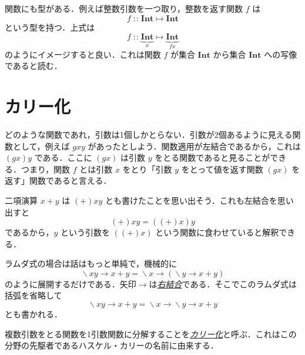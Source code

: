 \documentclass[a4paper]{jsbook}
\newcommand{\keyword}[1]{{\underline{\emph{#1}}}}
\newcommand{\mType}[1]{\mathbf{#1}}
\newcommand{\mIntType}{\mType{Int}}
\DeclareMathOperator{\mLambda}{\backslash}
\DeclareMathOperator{\mLambdaArrow}{\rightarrow}
\DeclareMathOperator{\mIn}{{:\!:}}
\DeclareMathOperator{\mMapsTo}{\mapsto}
\newcommand{\mLambdaExp}[2]{\mLambda{#1}\mLambdaArrow{#2}}
\newcommand{\mProjection}[2]{#1\mMapsTo#2}
\begin{document}
関数にも型がある．例えば整数引数を一つ取り，整数を返す関数 $f$ は
\begin{equation}
f\mIn\mProjection{\mIntType}{\mIntType}
\end{equation}
という型を持つ．上式は
\begin{equation}
f
\mIn\underbrace{\mIntType}_{x}
\mMapsTo
\underbrace{\mIntType}_{fx}
\end{equation}
のようにイメージすると良い．これは関数 $f$ が集合 $\mIntType$ から集合 $\mIntType$ への写像であると読む．

\section{カリー化}

どのような関数であれ，引数は1個しかとらない．引数が2個あるように見える関数として，例えば $gxy$ があったとしよう．関数適用が左結合であるから，これは $\left(gx\right)y$ である．ここに $\left(gx\right)$ は引数 $y$ をとる関数であると見ることができる．つまり，関数 $f$ とは引数 $x$ をとり「引数 $y$ をとって値を返す関数 $\left(gx\right)$ を返す」関数であると言える．

二項演算 $x+y$ は $(+)xy$ とも書けたことを思い出そう．これも左結合を思い出すと
\begin{equation}
(+)xy=\left((+)x\right)y
\end{equation}
であるから，$y$ という引数を $\left((+)x\right)$ という関数に食わせていると解釈できる．

ラムダ式の場合は話はもっと単純で，機械的に
\begin{equation}
\mLambdaExp{xy}{x+y}
=\mLambdaExp{x}{\left(\mLambdaExp{y}{x+y}\right)}
\end{equation}
のように展開するだけである．矢印$\mLambdaArrow$は\keyword{右結合}である．そこでこのラムダ式は括弧を省略して
\begin{equation}
\mLambdaExp{xy}{x+y}
=\mLambdaExp{x}{\mLambdaExp{y}{x+y}}
\end{equation}
とも書かれる．

複数引数をとる関数を1引数関数に分解することを\keyword{カリー化}と呼ぶ．これはこの分野の先駆者であるハスケル・カリーの名前に由来する．

\end{document}

